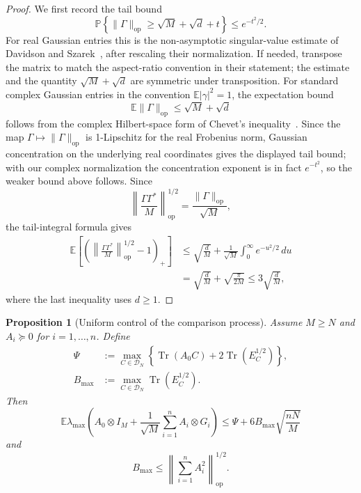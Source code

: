 \documentclass{article}
\newtheorem{proposition}[theorem]{Proposition}
\newcommand{\E}{\mathbb E}
\newcommand{\DN}{\mathcal D_N}
\newcommand{\op}{\mathrm{op}}
\newcommand{\Arow}{\left\|\sum_{i=1}^n A_i^2\right\|_{\op}^{1/2}}
\DeclareMathOperator{\Tr}{Tr}
\begin{document}
\begin{proof}
	We first record the tail bound
	\[
		\mathbb P\left\{
		\|\Gamma\|_{\op}\ge \sqrt M+\sqrt d+t
		\right\}
		\le e^{-t^2/2}.
	\]
	For real Gaussian entries this is the non-asymptotic singular-value estimate
	of Davidson and Szarek~\cite[Theorem~II.13]{DavidsonSzarek2001}, after
	rescaling their normalization.  If needed, transpose the matrix to match the
	aspect-ratio convention in their statement; the estimate and the quantity
	\(\sqrt M+\sqrt d\) are symmetric under transposition.  For standard complex
	Gaussian entries in the
	convention \(\E|\gamma|^2=1\), the
	expectation bound
	\[
		\E\|\Gamma\|_{\op}\le \sqrt M+\sqrt d
	\]
	follows from the complex Hilbert-space form of Chevet's
	inequality~\cite[Section~43]{TomczakJaegermann1989}.  Since the map
	$\Gamma\mapsto\|\Gamma\|_{\op}$ is 1-Lipschitz for the real Frobenius norm,
	Gaussian concentration on the underlying real coordinates gives the displayed
	tail bound; with our complex normalization the concentration exponent is in
	fact $e^{-t^2}$, so the weaker bound above follows.
	Since
	\[
		\left\|\frac{\Gamma\Gamma^*}{M}\right\|_{\op}^{1/2}
		=
		\frac{\|\Gamma\|_{\op}}{\sqrt M},
	\]
	the tail-integral formula gives
	\[
		\begin{aligned}
			\E\left[
				\left(
				\left\|\frac{\Gamma\Gamma^*}{M}\right\|_{\op}^{1/2}
				-1
				\right)_+
				\right]
			 & \le
			\sqrt{\frac dM}
			+
			\frac1{\sqrt M}\int_0^\infty e^{-u^2/2}\,du \\
			 & =
			\sqrt{\frac dM}
			+
			\sqrt{\frac{\pi}{2M}}
			\le
			3\sqrt{\frac dM},
		\end{aligned}
	\]
	where the last inequality uses $d\ge1$.
\end{proof}

\begin{proposition}[Uniform control of the comparison process]
	\label{prop:blockwishart}
	Assume $M\ge N$ and $A_i\succeq0$ for $i=1,\ldots,n$.
	Define
	\[
		\begin{aligned}
			\Psi
			         & :=
			\max_{C\in\DN}
			\left\{
			\Tr(A_0C)+2\Tr(E_C^{1/2})
			\right\},                                  \\
			B_{\max} & :=\max_{C\in\DN}\Tr(E_C^{1/2}).
		\end{aligned}
	\]
	Then
	\[
		\E\lambda_{\max}\left(
		A_0\otimes I_M+\frac1{\sqrt M}\sum_{i=1}^n A_i\otimes G_i
		\right)
		\le
		\Psi+6 B_{\max}\sqrt{\frac{nN}{M}}
	\]
	and
	\[
		B_{\max}\le \Arow.
	\]
\end{proposition}
\end{document}
